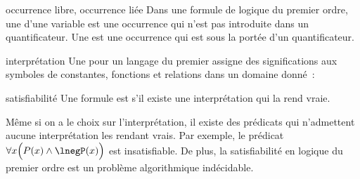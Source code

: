 \begin{definition}{}{occurrence libre, occurrence liée}
    Dans une formule de logique du premier ordre, une  d'une variable est une occurrence qui n'est pas introduite dans un quantificateur. Une  est une occurrence qui est sous la portée d'un quantificateur.
\end{definition}

\begin{definition}{}{interprétation}
    Une  pour un langage du premier assigne des significations aux symboles de constantes, fonctions et relations dans un domaine donné~:
\end{definition}

\begin{definition}{}{satisfiabilité}
    Une formule est  s'il existe une interprétation qui la rend vraie.
\end{definition}

\begin{remarque}{}{}
    Même si on a le choix sur l'interprétation, il existe des prédicats qui n'admettent aucune interprétation les rendant vrais. Par exemple, le prédicat $\forall x \Big(P(x) \land \lnegP(x)\Big)$ est insatisfiable.
    De plus, la satisfiabilité en logique du premier ordre est  un problème algorithmique indécidable.
\end{remarque}


